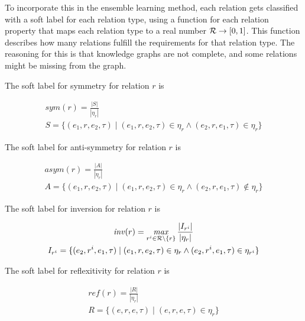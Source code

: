 To incorporate this in the ensemble learning method, each relation gets classified with a soft label for each relation type, using a function for each relation property that maps each relation type to a real number $\mathcal{R} \rightarrow [ 0 , 1 ]$. This function describes how many relations fulfill the requirements for that relation type. The reasoning for this is that knowledge graphs are not complete, and some relations might be missing from the graph.

The soft label for symmetry for relation $r$ is

\begin{equation}
\begin{gathered}
\mathit{sym}(r) = \frac{|S|}{|\eta_r|}\\
S = \{ (e_1, r, e_2, \tau) \mid (e_1, r, e_2, \tau) \in \eta_r \wedge (e_2, r, e_1, \tau) \in \eta_r \}
\end{gathered}
\end{equation}

\noindent
The soft label for anti-symmetry for relation $r$ is

\begin{equation}
\begin{gathered}
\mathit{asym}(r) = \frac{|A|}{|\eta_r|}\\
A = \{ (e_1, r, e_2, \tau) \mid (e_1, r, e_2, \tau) \in \eta_r \wedge (e_2, r, e_1, \tau) \notin \eta_r \}
\end{gathered}
\end{equation}

\noindent
The soft label for inversion for relation $r$ is

\begin{equation}
\begin{gathered}
\mathit{inv}(r) = \operatorname*{\mathit{max}}\limits_{r^i \in \mathcal{R} \setminus \{r\} } \frac{|I_{r^i}|}{|\eta_r|}\\
I_{r^i} = \{ (e_2, r^i, e_1, \tau) \mid (e_1, r, e_2, \tau) \in \eta_r \wedge (e_2, r^i, e_1, \tau) \in \eta_{r^i} \}
\end{gathered}
\end{equation}

\noindent
The soft label for reflexitivity for relation $r$ is

\begin{equation}
\begin{gathered}
\mathit{ref}(r) = \frac{|R|}{|\eta_r|}\\
R = \{ (e, r, e, \tau) \mid (e, r, e, \tau) \in \eta_r \}
\end{gathered}
\end{equation}

